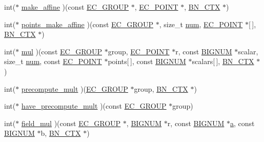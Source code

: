 \begin{DoxyCompactItemize}
\item 
int($\ast$ \hyperlink{structec__method__st_a35c3ae8c8f5f115a2ac2f4c87e322ca1}{make\+\_\+affine} )(const \hyperlink{crypto_2ec_2ec_8h_aca3c2dfa5546740e0f575013960a598a}{E\+C\+\_\+\+G\+R\+O\+UP} $\ast$, \hyperlink{crypto_2ec_2ec_8h_ab372a34de16c42eb0ccfa63be0ad985f}{E\+C\+\_\+\+P\+O\+I\+NT} $\ast$, \hyperlink{crypto_2ossl__typ_8h_a0b235a35b7dd7922c097571ecd90e2bc}{B\+N\+\_\+\+C\+TX} $\ast$)
\item 
int($\ast$ \hyperlink{structec__method__st_a85ad6e019ec550de3b409078a646e4ac}{points\+\_\+make\+\_\+affine} )(const \hyperlink{crypto_2ec_2ec_8h_aca3c2dfa5546740e0f575013960a598a}{E\+C\+\_\+\+G\+R\+O\+UP} $\ast$, size\+\_\+t \hyperlink{ssl__locl_8h_acc57d6ccf009b225ff81bbd136682d08}{num}, \hyperlink{crypto_2ec_2ec_8h_ab372a34de16c42eb0ccfa63be0ad985f}{E\+C\+\_\+\+P\+O\+I\+NT} $\ast$\mbox{[}$\,$\mbox{]}, \hyperlink{crypto_2ossl__typ_8h_a0b235a35b7dd7922c097571ecd90e2bc}{B\+N\+\_\+\+C\+TX} $\ast$)
\item 
int($\ast$ \hyperlink{structec__method__st_ababf9075864b9919d1895f11c69149bf}{mul} )(const \hyperlink{crypto_2ec_2ec_8h_aca3c2dfa5546740e0f575013960a598a}{E\+C\+\_\+\+G\+R\+O\+UP} $\ast$group, \hyperlink{crypto_2ec_2ec_8h_ab372a34de16c42eb0ccfa63be0ad985f}{E\+C\+\_\+\+P\+O\+I\+NT} $\ast$r, const \hyperlink{crypto_2ossl__typ_8h_a6fb19728907ec6515e4bfb716bffa141}{B\+I\+G\+N\+UM} $\ast$scalar, size\+\_\+t \hyperlink{ssl__locl_8h_acc57d6ccf009b225ff81bbd136682d08}{num}, const \hyperlink{crypto_2ec_2ec_8h_ab372a34de16c42eb0ccfa63be0ad985f}{E\+C\+\_\+\+P\+O\+I\+NT} $\ast$points\mbox{[}$\,$\mbox{]}, const \hyperlink{crypto_2ossl__typ_8h_a6fb19728907ec6515e4bfb716bffa141}{B\+I\+G\+N\+UM} $\ast$scalars\mbox{[}$\,$\mbox{]}, \hyperlink{crypto_2ossl__typ_8h_a0b235a35b7dd7922c097571ecd90e2bc}{B\+N\+\_\+\+C\+TX} $\ast$)
\item 
int($\ast$ \hyperlink{structec__method__st_ab17f24e7b6c65d47964b439a704a1f78}{precompute\+\_\+mult} )(\hyperlink{crypto_2ec_2ec_8h_aca3c2dfa5546740e0f575013960a598a}{E\+C\+\_\+\+G\+R\+O\+UP} $\ast$group, \hyperlink{crypto_2ossl__typ_8h_a0b235a35b7dd7922c097571ecd90e2bc}{B\+N\+\_\+\+C\+TX} $\ast$)
\item 
int($\ast$ \hyperlink{structec__method__st_a76a764becba4e47beebeccd6adfb22c1}{have\+\_\+precompute\+\_\+mult} )(const \hyperlink{crypto_2ec_2ec_8h_aca3c2dfa5546740e0f575013960a598a}{E\+C\+\_\+\+G\+R\+O\+UP} $\ast$group)
\item 
int($\ast$ \hyperlink{structec__method__st_a3812e1059e780a47c679cc14a73b88f9}{field\+\_\+mul} )(const \hyperlink{crypto_2ec_2ec_8h_aca3c2dfa5546740e0f575013960a598a}{E\+C\+\_\+\+G\+R\+O\+UP} $\ast$, \hyperlink{crypto_2ossl__typ_8h_a6fb19728907ec6515e4bfb716bffa141}{B\+I\+G\+N\+UM} $\ast$r, const \hyperlink{crypto_2ossl__typ_8h_a6fb19728907ec6515e4bfb716bffa141}{B\+I\+G\+N\+UM} $\ast$\hyperlink{hpux_8cc_af3e37283d97a42ffc096d8958a745f32}{a}, const \hyperlink{crypto_2ossl__typ_8h_a6fb19728907ec6515e4bfb716bffa141}{B\+I\+G\+N\+UM} $\ast$b, \hyperlink{crypto_2ossl__typ_8h_a0b235a35b7dd7922c097571ecd90e2bc}{B\+N\+\_\+\+C\+TX} $\ast$)

\end{DoxyCompactItemize}
